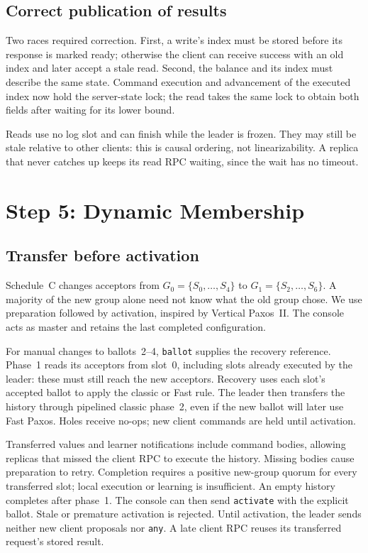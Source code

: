 \documentclass[times,10pt,twocolumn]{article}
\newcommand{\code}[1]{\texttt{\small #1}}
\begin{document}
\subsection{Correct publication of results}
Two races required correction. First, a write's index must be stored before
its response is marked ready; otherwise the client can receive success with
an old index and later accept a stale read. Second, the balance and its index
must describe the same state. Command execution and advancement of the
executed index now hold the server-state lock; the read takes the same lock
to obtain both fields after waiting for its lower bound.

Reads use no log slot and can finish while the leader is frozen. They may
still be stale relative to other clients: this is causal ordering, not
linearizability. A replica that never catches up keeps its read RPC waiting,
since the wait has no timeout.

\section{Step 5: Dynamic Membership}
\label{sec:step5}

\subsection{Transfer before activation}
Schedule~C changes acceptors from $G_0=\{S_0,\ldots,S_4\}$ to
$G_1=\{S_2,\ldots,S_6\}$. A majority of the new group alone need not know
what the old group chose. We use preparation followed by activation,
inspired by Vertical Paxos~II. The console acts as master and retains the
last completed configuration.

For manual changes to ballots~2--4, \code{ballot} supplies the recovery
reference. Phase~1 reads its acceptors from slot~0, including slots already
executed by the leader: these must still reach the new acceptors. Recovery
uses each slot's accepted ballot to apply the classic or Fast rule.
The leader then transfers the history through pipelined classic phase~2,
even if the new ballot will later use Fast Paxos. Holes receive no-ops;
new client commands are held until activation.

Transferred values and learner notifications include command bodies, allowing
replicas that missed the client RPC to execute the history. Missing bodies
cause preparation to retry. Completion requires a positive new-group quorum
for every transferred slot; local execution or learning is insufficient.
An empty history completes after phase~1. The console can then send
\code{activate} with the explicit ballot. Stale or premature activation is
rejected. Until activation, the leader sends neither new client proposals nor
\code{any}. A late client RPC reuses its transferred request's stored result.
\end{document}
